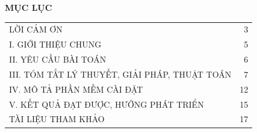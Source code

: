 \thispagestyle{empty}
\begin{center}
{\bfseries\fontsize{16}{20}\selectfont MỤC LỤC}
\end{center}
\vspace{0.4cm}
\begin{center}
\begin{tabular}{@{}p{}r@{}}
LỜI CẢM ƠN \dotfill & 3\\
I. GIỚI THIỆU CHUNG \dotfill & 5\\
II. YÊU CẦU BÀI TOÁN \dotfill & 6\\
III. TÓM TẮT LÝ THUYẾT, GIẢI PHÁP, THUẬT TOÁN \dotfill & 7\\
IV. MÔ TẢ PHẦN MỀM CÀI ĐẶT \dotfill & 12\\
V. KẾT QUẢ ĐẠT ĐƯỢC, HƯỚNG PHÁT TRIỂN \dotfill & 15\\
TÀI LIỆU THAM KHẢO \dotfill & 17
\end{tabular}
\end{center}
\clearpage
